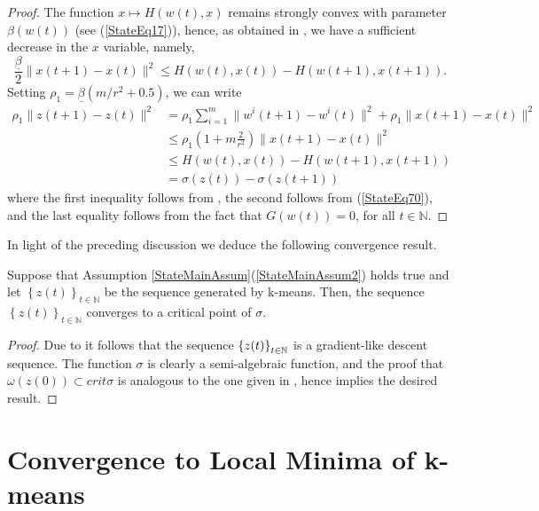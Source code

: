 \begin{proof}
The function $x \mapsto H(w(t),x)$ remains strongly convex with parameter $\beta(w(t))$ (see (\ref{StateEq17})), hence, as obtained in  , we have a sufficient decrease in the $x$ variable, namely,
\begin{equation}
	\frac{\underline{\beta}}{2} \|x(t+1)-x(t)\|^2 \leq H(w(t),x(t)) - H(w(t+1),x(t+1)) . \label{StateEq70}
\end{equation}
Setting $\rho_1 = \underline{\beta} \left(m/r^2 + 0.5\right)$, we can write
\begin{align*}
	\rho_1 \|z(t+1)-z(t)\|^2 &= \rho_1 \sum\limits_{i=1}^{m} \|w^i(t+1)-w^i(t)\|^2 + \rho_1 \|x(t+1)-x(t)\|^2 \\
	&\leq \rho_1 \left(1 + m\frac{2}{r^2}\right) \|x(t+1) - x(t)\|^2 \\
	&\leq H(w(t),x(t)) - H(w(t+1),x(t+1)) \\
	&= \sigma(z(t)) - \sigma(z(t+1))
\end{align*}
where the first inequality follows from , the second follows from (\ref{StateEq70}), and the last equality follows from the fact that $G(w(t))=0$, for all $t \in \mathbb{N}$.
\end{proof}

In light of the preceding discussion we deduce the following convergence result.

\begin{theorem}
Suppose that Assumption \ref{StateMainAssum}(\ref{StateMainAssum2}) holds true and let $\left\lbrace z(t) \right\rbrace_{t \in \mathbb{N}}$ be the sequence generated by k-means. Then, the sequence $\left\lbrace z(t) \right\rbrace_{t \in \mathbb{N}}$ converges to a critical point of $\sigma$.
\end{theorem}

\begin{proof}
Due to  it follows that the sequence $\left\lbrace z(t) \right\rbrace_{t \in \mathbb{N}}$ is a gradient-like descent sequence. The function $\sigma$ is clearly a semi-algebraic function, and the proof that $\omega(z(0)) \subset crit\sigma$ is analogous to the one given in , hence  implies the desired result.
\end{proof}

\section{Convergence to Local Minima of k-means}

